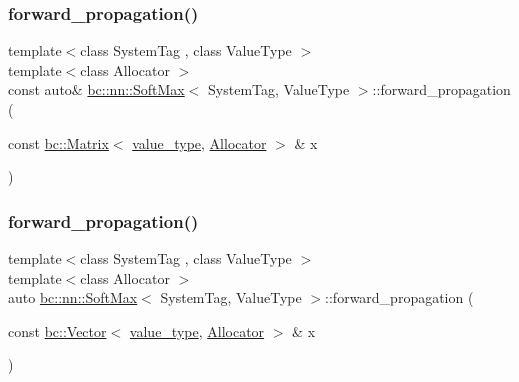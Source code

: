 \mbox{\label{structbc_1_1nn_1_1SoftMax_adab9740cba584dbda141a1324ffae83e}} 
\subsubsection{\texorpdfstring{forward\+\_\+propagation()}{forward\_propagation()}\hspace{0.1cm}{\footnotesize\ttfamily [1/2]}}
{\footnotesize\ttfamily template$<$class System\+Tag , class Value\+Type $>$ \\
template$<$class Allocator $>$ \\
const auto\& \hyperlink{structbc_1_1nn_1_1SoftMax}{bc\+::nn\+::\+Soft\+Max}$<$ System\+Tag, Value\+Type $>$\+::forward\+\_\+propagation (\begin{DoxyParamCaption}\item[{const \hyperlink{namespacebc_a92dd1e243183b382432a5fac3ed8b89f}{bc\+::\+Matrix}$<$ \hyperlink{structbc_1_1nn_1_1SoftMax_a7e53ef1c3b39ca65afa99d237b9353fa}{value\+\_\+type}, \hyperlink{classbc_1_1allocators_1_1Allocator}{Allocator} $>$ \&}]{x }\end{DoxyParamCaption})\hspace{0.3cm}{\ttfamily [inline]}}

\mbox{\label{structbc_1_1nn_1_1SoftMax_a1cbc897440f74d9ef44179e3e3857afb}} 
\subsubsection{\texorpdfstring{forward\+\_\+propagation()}{forward\_propagation()}\hspace{0.1cm}{\footnotesize\ttfamily [2/2]}}
{\footnotesize\ttfamily template$<$class System\+Tag , class Value\+Type $>$ \\
template$<$class Allocator $>$ \\
auto \hyperlink{structbc_1_1nn_1_1SoftMax}{bc\+::nn\+::\+Soft\+Max}$<$ System\+Tag, Value\+Type $>$\+::forward\+\_\+propagation (\begin{DoxyParamCaption}\item[{const \hyperlink{namespacebc_a14d40e8e95957f92a57853921837a15d}{bc\+::\+Vector}$<$ \hyperlink{structbc_1_1nn_1_1SoftMax_a7e53ef1c3b39ca65afa99d237b9353fa}{value\+\_\+type}, \hyperlink{classbc_1_1allocators_1_1Allocator}{Allocator} $>$ \&}]{x }\end{DoxyParamCaption})\hspace{0.3cm}{\ttfamily [inline]}}

